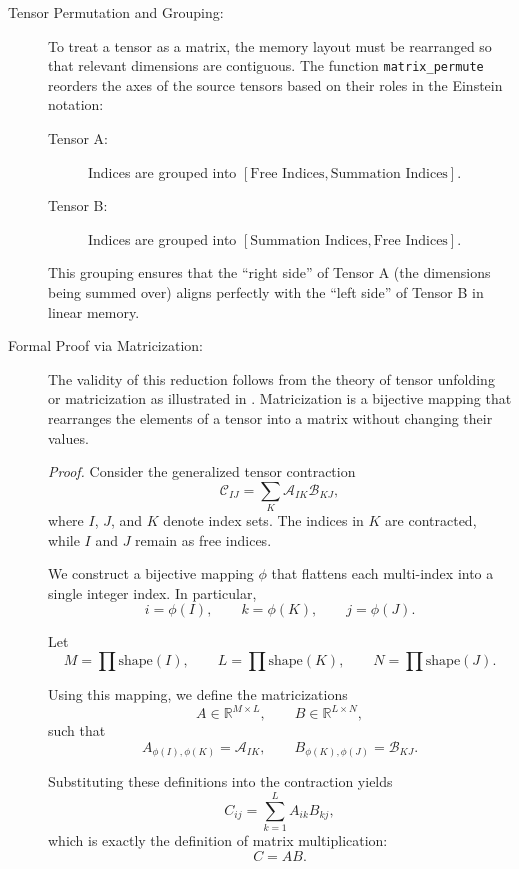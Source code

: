 \documentclass[binding=0.6cm]{sapthesis}
\begin{document}
\begin{description}
	\item [Tensor Permutation and Grouping:] To treat a tensor as a matrix, the memory layout must be rearranged so that relevant dimensions are contiguous. The function \texttt{matrix\_permute} reorders the axes of the source tensors based on their roles in the Einstein notation:
	      \begin{description}
		      \item [Tensor A:] Indices are grouped into $[ \text{Free Indices}, \text{Summation Indices} ]$.
		      \item [Tensor B:] Indices are grouped into $[ \text{Summation Indices}, \text{Free Indices} ]$.
	      \end{description}
	      This grouping ensures that the ``right side'' of Tensor A (the dimensions being summed over) aligns perfectly with the ``left side'' of Tensor B in linear memory.

	\item[Formal Proof via Matricization:]
	      The validity of this reduction follows from the theory of tensor unfolding or matricization as illustrated in \cite{kolda2009tensor}. Matricization is a bijective mapping that rearranges the elements of a tensor into a matrix without changing their values.

	      \textit{Proof.}
	      Consider the generalized tensor contraction
	      \[
		      \mathcal{C}_{IJ} = \sum_{K} \mathcal{A}_{IK}\mathcal{B}_{KJ},
	      \]
	      where $I$, $J$, and $K$ denote index sets. The indices in $K$ are contracted, while $I$ and $J$ remain as free indices.

	      We construct a bijective mapping $\phi$ that flattens each multi-index into a single integer index. In particular,
	      \[
		      i = \phi(I), \qquad
		      k = \phi(K), \qquad
		      j = \phi(J).
	      \]

	      Let
	      \[
		      M = \prod \text{shape}(I), \qquad
		      L = \prod \text{shape}(K), \qquad
		      N = \prod \text{shape}(J).
	      \]

	      Using this mapping, we define the matricizations
	      \[
		      A \in \mathbb{R}^{M \times L}, \qquad
		      B \in \mathbb{R}^{L \times N},
	      \]
	      such that
	      \[
		      A_{\phi(I),\phi(K)} = \mathcal{A}_{IK}, \qquad
		      B_{\phi(K),\phi(J)} = \mathcal{B}_{KJ}.
	      \]

	      Substituting these definitions into the contraction yields
	      \[
		      C_{ij} = \sum_{k=1}^{L} A_{ik} B_{kj},
	      \]
	      which is exactly the definition of matrix multiplication:
	      \[
		      C = AB.
	      \]


\end{description}
\end{document}
